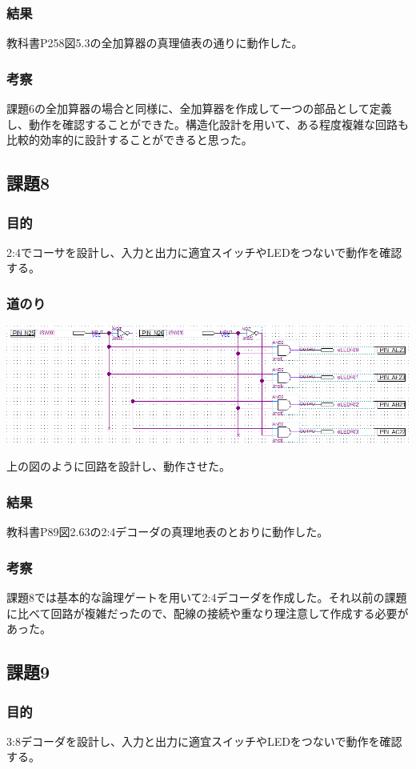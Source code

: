 \documentclass[a4paper]{jarticle}
\begin{document}
\subsubsection{結果}
教科書P258図5.3の全加算器の真理値表の通りに動作した。
\subsubsection{考察}
課題6の全加算器の場合と同様に、全加算器を作成して一つの部品として定義し、動作を確認することができた。構造化設計を用いて、ある程度複雑な回路も比較的効率的に設計することができると思った。
\subsection{課題8}
\subsubsection{目的}
2:4でコーサを設計し、入力と出力に適宜スイッチやLEDをつないで動作を確認する。
\subsubsection{道のり}
\begin{center}
	\includegraphics[width=15cm]{work8.PNG}
\end{center}
上の図のように回路を設計し、動作させた。
\subsubsection{結果}
教科書P89図2.63の2:4デコーダの真理地表のとおりに動作した。
\subsubsection{考察}
課題8では基本的な論理ゲートを用いて2:4デコーダを作成した。それ以前の課題に比べて回路が複雑だったので、配線の接続や重なり理注意して作成する必要があった。
\subsection{課題9}
\subsubsection{目的}
3:8デコーダを設計し、入力と出力に適宜スイッチやLEDをつないで動作を確認する。
\end{document}
